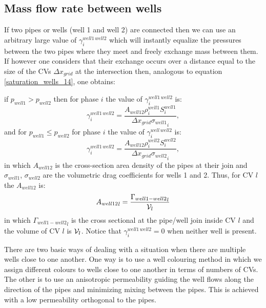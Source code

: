 \subsection{Mass flow rate between wells}
\label{Mass flow rate between wells}
If two pipes or wells (well 1 and well 2) are connected then we can use an arbitrary large value of
$\gamma_i^{well1\, well2}$ which will instantly equalize the pressures between the two pipes
where they meet and freely exchange mass between them. If however one considers that
their exchange occurs over a distance equal to the size of the CVs ${\Delta x}_{grid}$ at the intersection then,
analogous to equation \ref{saturation_wells_14}, one obtains:

\par\noindent
if $p_{well1}>p_{well2}$ then for phase $i$ the value of $\gamma_i^{well1\, well2}$ is:
\begin{equation}
\gamma_{i}^{well1\, well2}=\frac{A_{well12}  \rho_i^{well1} S_i^{well1} }{{{\Delta x}_{grid}\sigma_{well1}}_i},
\label{saturation_wells_11}
\end{equation}
and for $p_{well1}\leq p_{well2}$ for phase $i$ the value of $\gamma_i^{well\, well2}$ is:
\begin{equation}
\gamma_{i}^{well1\, well2}=\frac{A_{well12}  \rho_i^{well2} S_i^{well2} }{{{\Delta x}_{grid}\sigma_{well2}}_i} ,
\label{saturation_wells_12}
\end{equation}
in which $A_{well12}$ is the cross-section area density of the pipes at their join and $\sigma_{well1}$,  $\sigma_{well2}$
are the volumetric drag coefficients for wells 1 and 2.  Thus, for CV $l$ the $A_{well12}$ is:
\begin{equation}
{A_{well12}}_l =  \frac{  {\Gamma_{well1-well2}}_l  }{ {\cal V}_l }
\label{saturation_wells_12b}
\end{equation}
in which ${\Gamma_{well1-well2}}_l$ is the cross sectional at the pipe/well join inside CV $l$
and the volume of CV $l$ is ${\cal V}_l$. Notice that $\gamma_i^{well1 \, well2}=0$ when
neither well is present.

There are two basic ways of dealing with a situation when there are multiple wells close to one
another. One way is to use a well colouring method in which we assign different colours to wells
close to one another in terms of numbers of CVs. The other is to use an anisotropic permeability
guiding the well flows along the direction of the pipes and minimizing mixing between the
pipes. This is achieved with a low permeability orthogonal to the pipes.



